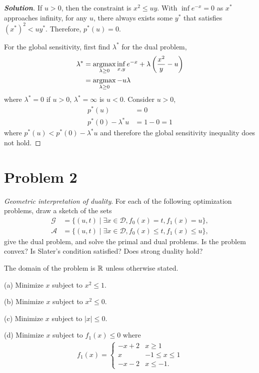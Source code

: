 \documentclass[11pt]{article}
\newenvironment{solution}
  {\renewcommand\qedsymbol{$\square$}\begin{proof}[\textbf{Solution}]}
  {\end{proof}}
\begin{document}
\begin{solution}
If $u > 0$, then the constraint is $x^2 \leq uy$. With $\inf e^{-x} = 0$ as $x^*$ approaches infinity, for any $u$, there always exists some $y^*$ that satisfies $(x^*)^2 < uy^*$. Therefore, $p^*(u) = 0$.

For the global sensitivity, first find $\lambda^*$ for the dual problem, 
\begin{align*}
    \lambda^* &= \mathop{\rm argmax}_{\lambda \geq 0} \inf_{x,y} e^{-x} + \lambda \left(\frac{x^2}{y} - u \right) \\
    &= \mathop{\rm argmax}_{\lambda \geq 0} -u \lambda
\end{align*}
where $\lambda^* = 0$ if $u > 0$, $\lambda^* = \infty$ is $u<0$. Consider $u>0$, 
\begin{align*}
    p^*(u) &= 0 \\
    p^*(0) - \lambda^* u &= 1 - 0 = 1
\end{align*}
where $p^*(u) < p^*(0) - \lambda^* u$ and therefore the global sensitivity inequality does not hold. 




\end{solution}


\clearpage
\section*{Problem 2}
\textit{Geometric interpretation of duality}. For each of the following optimization problems, draw a sketch of the sets
\begin{align*}
  \mathcal{G} &= \{(u, t)\mid \exists x\in \mathcal{D}, f_0(x) = t, f_1(x) = u\},\\
  \mathcal{A} &= \{(u, t)\mid \exists x\in \mathcal{D}, f_0(x) \leq t, f_1(x) \leq u\},
\end{align*}
give the dual problem, and solve the primal and dual problems. Is the problem convex? Is Slater's condition satisfied? Does strong duality hold?

The domain of the problem is ${{\mathbb{R}}}$ unless otherwise stated.

(a) Minimize $x$ subject to $x^2 \leq 1$.

(b) Minimize $x$ subject to $x^2 \leq 0$.

(c) Minimize $x$ subject to $|x| \leq 0$.

(d) Minimize $x$ subject to $f_1(x) \leq 0$ where
\begin{align*}
  f_1(x) = 
  \begin{cases}
    -x + 2 & x \geq 1\\
    x & -1 \leq x \leq 1\\
    -x-2 & x\leq -1.
  \end{cases}
\end{align*}
\end{document}

